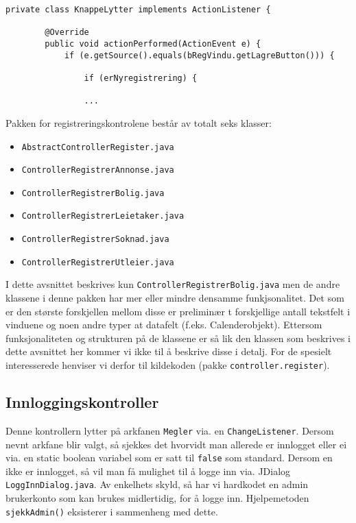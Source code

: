 \begin{lstlisting}[caption=\texttt{ControllerRegistrerBolig.java}: Uttdrag fra privat lytterklasse i kontrolleren.,label=kode:regex_bolig3]
    private class KnappeLytter implements ActionListener {

        @Override
        public void actionPerformed(ActionEvent e) {
            if (e.getSource().equals(bRegVindu.getLagreButton())) {

                if (erNyregistrering) {
                
                ...
\end{lstlisting}


Pakken for registreringskontrolene består av totalt seks klasser:
\begin{itemize}[noitemsep,nolistsep]
\item \texttt{AbstractControllerRegister.java}
\item \texttt{ControllerRegistrerAnnonse.java}
\item \texttt{ControllerRegistrerBolig.java}
\item \texttt{ControllerRegistrerLeietaker.java}
\item \texttt{ControllerRegistrerSoknad.java}
\item \texttt{ControllerRegistrerUtleier.java}
\end{itemize}

I dette avsnittet beskrives kun \texttt{ControllerRegistrerBolig.java} men de andre klassene i denne pakken har mer eller mindre densamme funkjsonalitet. Det som er den største forskjellen mellom disse er preliminær t forskjellige antall tekstfelt i vinduene og noen andre typer at datafelt (f.eks. Calenderobjekt). Ettersom funksjonaliteten og strukturen på de klassene er så lik den klassen som beskrives i dette avsnittet her kommer vi ikke til å beskrive disse i detalj. For de spesielt interesserede henviser vi derfor til kildekoden (pakke \texttt{controller.register}).



\subsection{Innloggingskontroller}
Denne kontrollern lytter på arkfanen \texttt{Megler} via. en \texttt{ChangeListener}. Dersom nevnt arkfane blir valgt, så sjekkes det hvorvidt man allerede er innlogget eller ei via. en static boolean variabel som er satt til \texttt{false} som standard. Dersom en ikke er innlogget, så vil man få mulighet til å logge inn via. JDialog \texttt{LoggInnDialog.java}. Av enkelhets skyld, så har vi hardkodet en admin brukerkonto som kan brukes midlertidig, for å logge inn. Hjelpemetoden \texttt{sjekkAdmin()} eksisterer i sammenheng med dette. 

